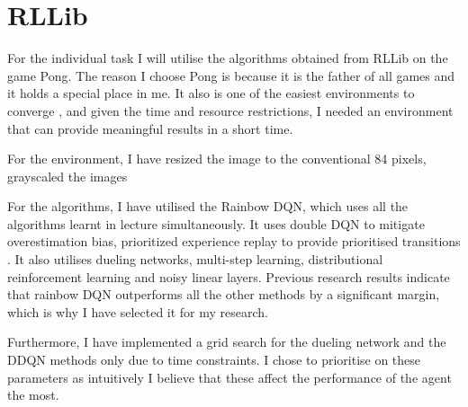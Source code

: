 \section{RLLib}
For the individual task I will utilise the algorithms obtained from RLLib on the game Pong. The reason I choose Pong is because it is the father of all games and it holds a special place in me. It also is one of the easiest environments to converge \cite{Pong}, and given the time and resource restrictions, I needed an environment that can provide meaningful results in a short time. 

For the environment, I have resized the image to the conventional 84  pixels, grayscaled the images 

For the algorithms, I have utilised the Rainbow DQN, which uses all the algorithms learnt in lecture simultaneously. It uses double DQN to mitigate overestimation bias, prioritized experience replay to provide prioritised transitions \cite{hessel2017rainbow}. It also utilises dueling networks, multi-step learning, distributional reinforcement learning and noisy linear layers. Previous research results indicate that rainbow DQN outperforms all the other methods by a significant margin, which is why I have selected it for my research.

Furthermore, I have implemented a grid search for the dueling network and the DDQN methods only due to time constraints. I chose to prioritise on these parameters as intuitively I believe that these affect the performance of the agent the most.

